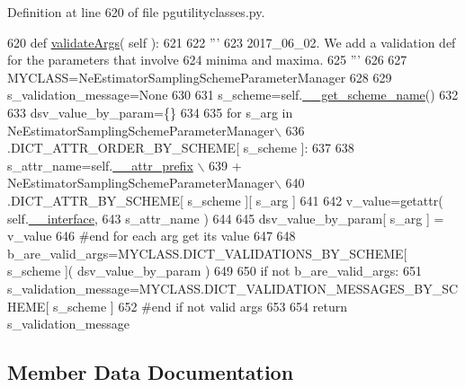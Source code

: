 Definition at line 620 of file pgutilityclasses.\+py.


\begin{DoxyCode}
620     \textcolor{keyword}{def }\hyperlink{classnegui_1_1pgutilityclasses_1_1NeEstimatorSamplingSchemeParameterManager_a0d0a4f323eedc2f1ffbb0fc75202250b}{validateArgs}( self ):
621 
622         \textcolor{stringliteral}{'''}
623 \textcolor{stringliteral}{        2017\_06\_02.  We add a validation def for the parameters that involve}
624 \textcolor{stringliteral}{        minima and maxima.}
625 \textcolor{stringliteral}{        '''}
626 
627         MYCLASS=NeEstimatorSamplingSchemeParameterManager
628         
629         s\_validation\_message=\textcolor{keywordtype}{None}
630 
631         s\_scheme=self.\hyperlink{classnegui_1_1pgutilityclasses_1_1NeEstimatorSamplingSchemeParameterManager_a1fab8ff3ea6f77d959c159340822a65a}{\_\_get\_scheme\_name}()
632         
633         dsv\_value\_by\_param=\{\}
634 
635         \textcolor{keywordflow}{for} s\_arg \textcolor{keywordflow}{in} NeEstimatorSamplingSchemeParameterManager\(\backslash\)
636                             .DICT\_ATTR\_ORDER\_BY\_SCHEME[ s\_scheme ]:
637 
638             s\_attr\_name=self.\hyperlink{classnegui_1_1pgutilityclasses_1_1NeEstimatorSamplingSchemeParameterManager_a630981f5e5b02ac43669ec089f0c5926}{\_\_attr\_prefix} \(\backslash\)
639                     + NeEstimatorSamplingSchemeParameterManager\(\backslash\)
640                                             .DICT\_ATTR\_BY\_SCHEME[ s\_scheme ][ s\_arg ]
641 
642             v\_value=getattr( self.\hyperlink{classnegui_1_1pgutilityclasses_1_1NeEstimatorSamplingSchemeParameterManager_a5b725d2967c9f00c20ace16532ed97b5}{\_\_interface}, 
643                                     s\_attr\_name )
644 
645             dsv\_value\_by\_param[ s\_arg ] = v\_value
646         \textcolor{comment}{#end for each arg get its value}
647 
648         b\_are\_valid\_args=MYCLASS.DICT\_VALIDATIONS\_BY\_SCHEME[ s\_scheme ]( dsv\_value\_by\_param )
649 
650         \textcolor{keywordflow}{if} \textcolor{keywordflow}{not} b\_are\_valid\_args:
651             s\_validation\_message=MYCLASS.DICT\_VALIDATION\_MESSAGES\_BY\_SCHEME[ s\_scheme ]
652         \textcolor{comment}{#end if not valid args}
653         
654         \textcolor{keywordflow}{return} s\_validation\_message
\end{DoxyCode}


\subsection{Member Data Documentation}
